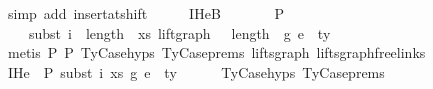 \begin{isabellebody}
\ {\isacharparenleft}{\kern0pt}simp\ add{\isacharcolon}{\kern0pt}\ insert{\isacharunderscore}{\kern0pt}at{\isacharunderscore}{\kern0pt}shift{\isacharparenright}{\kern0pt}\isanewline
\ \ \isamarkupfalse%
\ \isamarkupfalse%
\ IHe{}B{\isacharcolon}{\kern0pt}\isanewline
\ \ \ \ {\isachardoublequoteopen}{\isasymGamma}{}{\isacharprime}{\kern0pt}\ {\isacharat}{\kern0pt}\ {\isasymGamma}{}\ {\isasymturnstile}{\isacharbraceleft}{\kern0pt}P{\isacharbraceright}{\kern0pt}\isanewline
\ \ \ \ subst\ {\isacharparenleft}{\kern0pt}i\ {\isacharplus}{\kern0pt}\ length\ {\isasymGamma}{}{\isacharprime}{\kern0pt}{\isacharparenright}{\kern0pt}\ xs\ {\isacharparenleft}{\kern0pt}{\isacharparenleft}{\kern0pt}lift{\isacharunderscore}{\kern0pt}graph\ {}\ {\isacharcircum}{\kern0pt}{\isacharcircum}{\kern0pt}\ {\isacharparenleft}{\kern0pt}length\ {\isasymGamma}{}{\isacharprime}{\kern0pt}{\isacharparenright}{\kern0pt}{\isacharparenright}{\kern0pt}\ g{}{\isacharparenright}{\kern0pt}\ e{}\ {\isacharcolon}{\kern0pt}\ ty{}{\isacharprime}{\kern0pt}{\isachardoublequoteclose}\isanewline
\ \ \ \isamarkupfalse%
\ {\isacharparenleft}{\kern0pt}metis\ P{}\ P{}\ TyCase{\isachardot}{\kern0pt}hyps{\isacharparenleft}{\kern0pt}{}{\isacharparenright}{\kern0pt}\ TyCase{\isachardot}{\kern0pt}prems{\isacharparenleft}{\kern0pt}{}{\isacharcomma}{\kern0pt}{}{\isacharparenright}{\kern0pt}\ lifts{\isacharunderscore}{\kern0pt}graph{}\ lifts{\isacharunderscore}{\kern0pt}graph{\isacharunderscore}{\kern0pt}freelinks{\isacharparenright}{\kern0pt}\isanewline
\isanewline
\ \ \isamarkupfalse%
\ IHe{}{\isacharcolon}{\kern0pt}\ {\isachardoublequoteopen}{\isasymGamma}{}\ {\isasymturnstile}{\isacharbraceleft}{\kern0pt}P{\isacharbraceright}{\kern0pt}\ subst\ i\ xs\ g{}\ e{}\ {\isacharcolon}{\kern0pt}\ ty{}{\isacharprime}{\kern0pt}{\isachardoublequoteclose}\isanewline
\ \ \ \ \isamarkupfalse%
\ TyCase{\isachardot}{\kern0pt}hyps{\isacharparenleft}{\kern0pt}{}{\isacharparenright}{\kern0pt}\ TyCase{\isachardot}{\kern0pt}prems{\isacharparenleft}{\kern0pt}{}{\isacharcomma}{\kern0pt}{}{\isacharcomma}{\kern0pt}{}{\isacharcomma}{\kern0pt}{}{\isacharcomma}{\kern0pt}{}{\isacharparenright}{\kern0pt}\ \isamarkupfalse%

\end{isabellebody}
